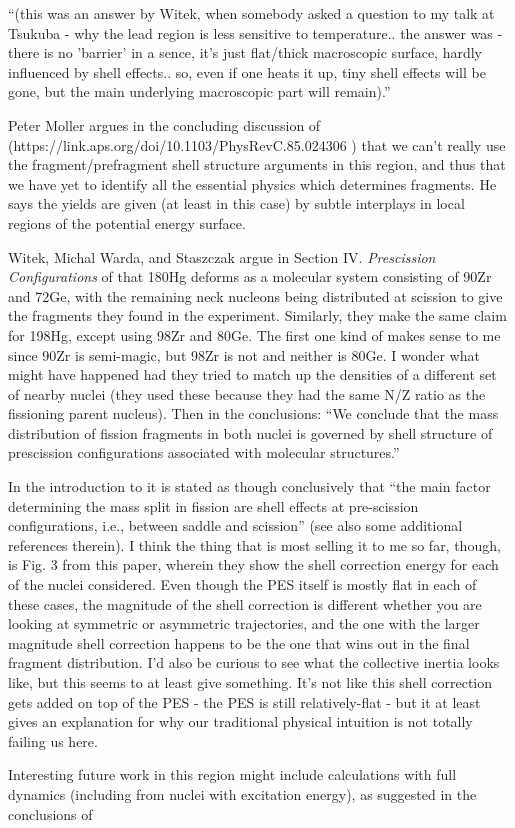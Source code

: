 ``(this was an answer by Witek, when somebody asked a question to my talk at Tsukuba - why the lead region is less sensitive to temperature.. the answer was - there is no 'barrier' in a sence, it's just flat/thick macroscopic surface, hardly influenced by shell effects.. so, even if one heats it up, tiny shell effects will be gone, but the main underlying macroscopic part will remain).''

Peter Moller argues in the concluding discussion of (https://link.aps.org/doi/10.1103/PhysRevC.85.024306 \cite{Moller2012}) that we can't really use the fragment/prefragment shell structure arguments in this region, and thus that we have yet to identify all the essential physics which determines fragments. He says the yields are given (at least in this case) by subtle interplays in local regions of the potential energy surface.

Witek, Michal Warda, and Staszczak argue in Section IV. \textit{Prescission Configurations} of \cite{Warda2012a} that 180Hg deforms as a molecular system consisting of 90Zr and 72Ge, with the remaining neck nucleons being distributed at scission to give the fragments they found in the experiment. Similarly, they make the same claim for 198Hg, except using 98Zr and 80Ge. The first one kind of makes sense to me since 90Zr is semi-magic, but 98Zr is not and neither is 80Ge. I wonder what might have happened had they tried to match up the densities of a different set of nearby nuclei (they used these because they had the same N/Z ratio as the fissioning parent nucleus). Then in the conclusions: ``We conclude that the mass distribution of fission fragments in both nuclei is governed by shell structure of prescission configurations associated with molecular structures.''

In the introduction to \cite{Mcdonnell2014} it is stated as though conclusively that ``the main factor determining the mass split in fission are shell effects at pre-scission configurations, i.e., between saddle and scission'' (see also some additional references therein). I think the thing that is most selling it to me so far, though, is Fig. 3 from this paper, wherein they show the shell correction energy for each of the nuclei considered. Even though the PES itself is mostly flat in each of these cases, the magnitude of the shell correction is different whether you are looking at symmetric or asymmetric trajectories, and the one with the larger magnitude shell correction happens to be the one that wins out in the final fragment distribution. I'd also be curious to see what the collective inertia looks like, but this seems to at least give something. It's not like this shell correction gets added on top of the PES - the PES is still relatively-flat - but it at least gives an explanation for why our traditional physical intuition is not totally failing us here.

Interesting future work in this region might include calculations with full dynamics (including from nuclei with excitation energy), as suggested in the conclusions of \cite{Mcdonnell2014}






